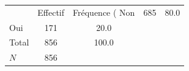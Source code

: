 {
\def\sym#1{\ifmmode^{#1}\else\(^{#1}\)\fi}
\begin{tabular}{l*{1}{cc}}
\toprule
            &    Effectif&Fréquence (%
\midrule
Non         &         685&        80.0\\
Oui         &         171&        20.0\\
Total       &         856&       100.0\\
\midrule
\(N\)       &         856&            \\
\bottomrule
\end{tabular}
}
